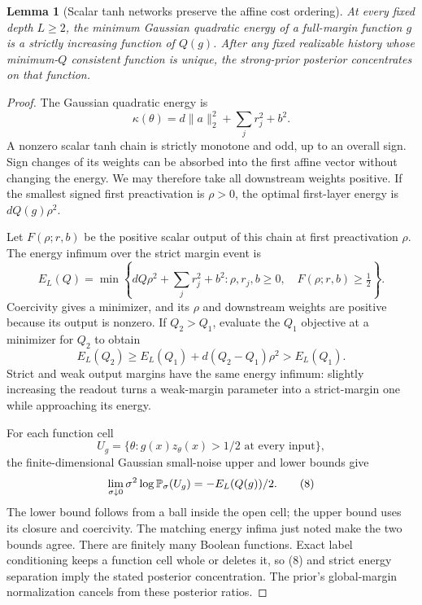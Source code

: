 \documentclass[11pt]{article}
\newtheorem{lemma}[theorem]{Lemma}
\theoremstyle{remark}\newtheorem{remark}[theorem]{Remark}
\begin{document}
\begin{lemma}[Scalar tanh networks preserve the affine cost ordering]
\label{lem:energy}
At every fixed depth $L\ge2$, the minimum Gaussian quadratic energy of a
full-margin function $g$ is a strictly increasing function of $Q(g)$.
After any fixed realizable history whose minimum-$Q$ consistent function
is unique, the strong-prior posterior concentrates on that function.
\end{lemma}
\begin{proof}
The Gaussian quadratic energy is
\[
 \kappa(\theta)=d\|a\|_2^2+\sum_j r_j^2+b^2.
\]
A nonzero scalar tanh chain is strictly monotone and odd, up to an overall
sign. Sign changes of its weights can be absorbed into the first affine
vector without changing the energy. We may therefore take all downstream
weights positive. If the smallest signed first preactivation is $\rho>0$,
the optimal first-layer energy is $dQ(g)\rho^2$.

Let $F(\rho;r,b)$ be the positive scalar output of this chain at first
preactivation $\rho$. The energy infimum over the strict margin event is
\[
 E_L(Q)=\min\left\{dQ\rho^2+\sum_jr_j^2+b^2:
       \rho,r_j,b\ge0,\quad F(\rho;r,b)\ge\tfrac12\right\}. \tag{7}
\]
Coercivity gives a minimizer, and its $\rho$ and downstream weights are
positive because its output is nonzero. If $Q_2>Q_1$, evaluate the
$Q_1$ objective at a minimizer for $Q_2$ to obtain
\[
 E_L(Q_2)\ge E_L(Q_1)+d(Q_2-Q_1)\rho^2>E_L(Q_1).
\]
Strict and weak output margins have the same energy infimum: slightly
increasing the readout turns a weak-margin parameter into a strict-margin
one while approaching its energy.

For each function cell
\[
 U_g=\{\theta:g(x)z_\theta(x)>1/2\text{ at every input}\},
\]
the finite-dimensional Gaussian small-noise upper and lower bounds give
\[
 \lim_{\sigma\downarrow0}\sigma^2\log\mathbb P_\sigma(U_g)
       =-E_L(Q(g))/2.                                    \tag{8}
\]
The lower bound follows from a ball inside the open cell; the upper bound
uses its closure and coercivity. The matching energy infima just noted
make the two bounds agree. There are finitely many Boolean functions.
Exact label conditioning keeps a function cell whole or deletes it, so
(8) and strict energy separation imply the stated posterior concentration.
The prior's global-margin normalization cancels from these posterior ratios.
\end{proof}
\end{document}
